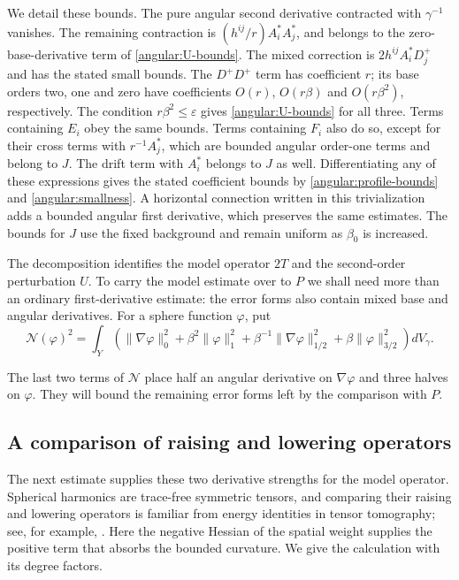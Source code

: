 \documentclass[11pt]{article}
\theoremstyle{definition}
\theoremstyle{remark}
\newcommand{\eps}{\varepsilon}
\numberwithin{equation}{section}
\begin{document}
We detail these bounds.  The pure angular second derivative contracted
with $\gamma^{-1}$ vanishes.  The remaining contraction is
$(h^{ij}/r)A_i^*A_j^*$, and belongs to the zero-base-derivative term of
\eqref{angular:U-bounds}.  The mixed correction is
$2h^{ij}A_i^*D_j^+$ and has the stated small bounds.  The $D^+D^+$ term
has coefficient $r$; its base orders two, one and zero have coefficients
$O(r)$, $O(r\beta)$ and $O(r\beta^2)$, respectively.  The condition
$r\beta^2\le\eps$ gives \eqref{angular:U-bounds} for all three.
Terms containing $E_i$ obey the same bounds.  Terms containing $F_i$
also do so, except for their cross terms with $r^{-1}A_j^*$, which are
bounded angular order-one terms and belong to $J$.  The drift term with
$A_i^*$ belongs to $J$ as well.  Differentiating any of these expressions
gives the stated coefficient bounds by
\eqref{angular:profile-bounds} and \eqref{angular:smallness}.
A horizontal connection written in this trivialization adds a bounded
angular first derivative, which preserves the same estimates.  The bounds
for $J$ use the fixed background and remain uniform as $\beta_0$ is
increased.

The decomposition identifies the model operator $2T$ and the
second-order perturbation $U$.  To carry the model estimate over to $P$
we shall need more than an ordinary first-derivative estimate: the error forms
also contain mixed base and angular derivatives.  For a sphere function
$\varphi$, put
\begin{equation}\label{angular:N-definition}
 \mathcal N(\varphi)^2
 =\int_Y\left(
  \|\nabla\varphi\|_0^2+\beta^2\|\varphi\|_1^2
  +\beta^{-1}\|\nabla\varphi\|_{1/2}^2
  +\beta\|\varphi\|_{3/2}^2\right)dV_\gamma.
\end{equation}

The last two terms of $\mathcal N$ place half an angular derivative
on $\nabla\varphi$ and three halves on $\varphi$.  They will bound the
remaining error forms left by the comparison with $P$.

\subsection{A comparison of raising and lowering operators}

The next estimate supplies these two derivative strengths for the model
operator.  Spherical harmonics are trace-free symmetric tensors, and
comparing their raising and lowering operators is familiar from energy
identities in tensor tomography; see, for example, \cite{PSU15,GPSU16}.
Here the negative Hessian of the spatial weight supplies the positive
term that absorbs the bounded curvature.  We give the calculation with
its degree factors.
\end{document}
